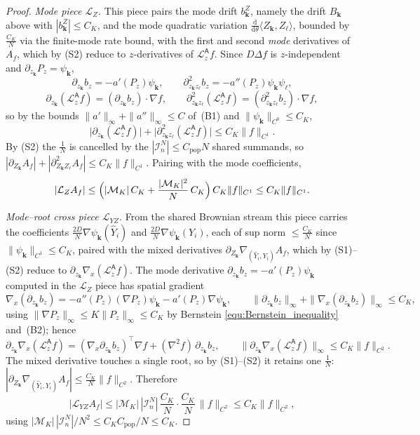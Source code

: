 \documentclass[a4paper,fleqn]{cas-sc}
\theoremstyle{definition}
\theoremstyle{remark}
\begin{document}
\begin{proof}
\emph{Mode piece $\mathcal L_Z$.}
This piece pairs the mode drift $b^{Z}_{\mathbf k}$, namely the drift $B_{\mathbf k}$ above
with $|b^Z_{\mathbf k}|\le C_K$, and the mode quadratic variation
$\tfrac{\mathrm d}{\mathrm d\theta}\langle Z_{\mathbf k},Z_\ell\rangle$, bounded by $\tfrac{C_K}N$ via the
finite-mode rate bound, with the first and second \emph{mode} derivatives of $A_f$, which by (S2) reduce
to $z$-derivatives of $\mathcal L^{\mathsf A}_zf$. Since $D\Delta f$ is $z$-independent and
$\partial_{z_{\mathbf k}}P_z=\psi_{\mathbf k}$,
\[
\partial_{z_{\mathbf k}}b_z=-a'(P_z)\psi_{\mathbf k},\qquad
\partial^2_{z_{\mathbf k}z_\ell}b_z=-a''(P_z)\psi_{\mathbf k}\psi_\ell,
\]
\[
\partial_{z_{\mathbf k}}(\mathcal L^{\mathsf A}_zf)=(\partial_{z_{\mathbf k}}b_z)\!\cdot\!\nabla f,\qquad
\partial^2_{z_{\mathbf k}z_\ell}(\mathcal L^{\mathsf A}_zf)=(\partial^2_{z_{\mathbf k}z_\ell}b_z)\!\cdot\!\nabla f,
\]
so by the bounds $\|a'\|_\infty+\|a''\|_\infty\le C$ of~(B1) and $\|\psi_{\mathbf k}\|_{C^0}\le C_K$,
\[
\bigl|\partial_{z_{\mathbf k}}(\mathcal L^{\mathsf A}_zf)\bigr|+\bigl|\partial^2_{z_{\mathbf k}z_\ell}(\mathcal L^{\mathsf A}_zf)\bigr|\le C_K\|f\|_{C^1}.
\]
By (S2) the $\tfrac1N$ is cancelled by the $|\mathcal I^N_n|\le C_{\mathrm{pop}}N$ shared summands, so
$|\partial_{Z_{\mathbf k}}A_f|+|\partial^2_{Z_{\mathbf k}Z_\ell}A_f|\le C_K\|f\|_{C^1}$. Pairing with the
mode coefficients,
\[
|\mathcal L_ZA_f|
\le\Bigl(|\mathcal M_K|\,C_K+\frac{|\mathcal M_K|^2}N\,C_K\Bigr)\,C_K\|f\|_{C^1}
\le C_K\|f\|_{C^1}.
\]

\emph{Mode--root cross piece $\mathcal L_{YZ}$.}
From the shared Brownian stream this piece carries the coefficients
$\tfrac{2D}N\nabla\psi_{\mathbf k}(\widehat Y_i)$ and $\tfrac{2D}N\nabla\psi_{\mathbf k}(Y_i)$, each of sup
norm $\le\tfrac{C_K}N$ since $\|\psi_{\mathbf k}\|_{C^1}\le C_K$, paired with the mixed derivatives
$\partial_{Z_{\mathbf k}}\nabla_{(\widehat Y_i,Y_i)}A_f$, which by (S1)--(S2) reduce to
$\partial_{z_{\mathbf k}}\nabla_x(\mathcal L^{\mathsf A}_zf)$. The mode derivative
$\partial_{z_{\mathbf k}}b_z=-a'(P_z)\psi_{\mathbf k}$ computed in the $\mathcal L_Z$ piece has spatial gradient
\[
\nabla_x(\partial_{z_{\mathbf k}}b_z)=-a''(P_z)(\nabla P_z)\psi_{\mathbf k}-a'(P_z)\nabla\psi_{\mathbf k},\qquad
\|\partial_{z_{\mathbf k}}b_z\|_\infty+\|\nabla_x(\partial_{z_{\mathbf k}}b_z)\|_\infty\le C_K,
\]
using $\|\nabla P_z\|_\infty\le K\|P_z\|_\infty\le C_K$ by Bernstein
\eqref{equ:Bernstein_inequality} and~(B2); hence
\[
\partial_{z_{\mathbf k}}\nabla_x(\mathcal L^{\mathsf A}_zf)=(\nabla_x\partial_{z_{\mathbf k}}b_z)^{\!\top}\nabla f+(\nabla^2f)\,\partial_{z_{\mathbf k}}b_z,
\qquad
\|\partial_{z_{\mathbf k}}\nabla_x(\mathcal L^{\mathsf A}_zf)\|_\infty\le C_K\|f\|_{C^2}.
\]
The mixed derivative touches a single root, so by (S1)--(S2) it retains one $\tfrac1N$:
$|\partial_{Z_{\mathbf k}}\nabla_{(\widehat Y_i,Y_i)}A_f|\le\tfrac{C_K}N\|f\|_{C^2}$. Therefore
\[
|\mathcal L_{YZ}A_f|
\le|\mathcal M_K|\,|\mathcal I^N_n|\,\frac{C_K}N\cdot\frac{C_K}N\,\|f\|_{C^2}
\le C_K\|f\|_{C^2},
\]
using $|\mathcal M_K|\,|\mathcal I^N_n|/N^2\le C_KC_{\mathrm{pop}}/N\le C_K$.


\end{proof}
\end{document}
